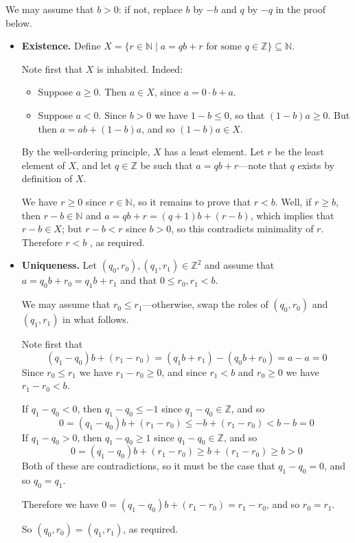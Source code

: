 \begin{cproof}
We may assume that $b>0$: if not, replace $b$ by $-b$ and $q$ by $-q$ in the proof below.

\begin{itemize}
\item \textbf{Existence.} Define $X = \{ r \in \mathbb{N} \mid a = qb+r \text{ for some } q \in \mathbb{Z} \} \subseteq \mathbb{N}$.

Note first that $X$ is inhabited. Indeed:
\begin{itemize}
\item Suppose $a \ge 0$. Then $a \in X$, since $a = 0 \cdot b + a$.
\item Suppose $a<0$. Since $b > 0$ we have $1-b \le 0$, so that $(1-b)a \ge 0$. But then $a = ab + (1-b)a$, and so $(1-b)a \in X$.
\end{itemize}

By the well-ordering principle, $X$ has a least element. Let $r$ be the least element of $X$, and let $q \in \mathbb{Z}$ be such that $a=qb+r$---note that $q$ exists by definition of $X$.

We have $r \ge 0$ since $r \in \mathbb{N}$, so it remains to prove that $r<b$. Well, %
if $r \ge b$, then $r-b \in \mathbb{N}$ and $a = qb+r = (q+1)b + (r-b)$, which implies that $r-b \in X$; but $r-b<r$ since $b>0$, so this contradicts minimality of $r$. Therefore $r<b$
, as required.

\item \textbf{Uniqueness.} Let $(q_0,r_0),(q_1,r_1) \in \mathbb{Z}^2$ and assume that $a=q_0b+r_0 = q_1b+r_1$ and that $0 \le r_0,r_1 < b$.

We may assume that $r_0 \le r_1$---otherwise, swap the roles of $(q_0,r_0)$ and $(q_1,r_1)$ in what follows.

Note first that
\[(q_1-q_0)b + (r_1-r_0) = (q_1b+r_1) - (q_0b+r_0) = a-a = 0 \]
Since $r_0 \le r_1$ we have $r_1-r_0 \ge 0$, and since $r_1<b$ and $r_0 \ge 0$ we have $r_1-r_0 < b$.

If $q_1-q_0<0$, then $q_1-q_0 \le -1$ since $q_1-q_0 \in \mathbb{Z}$, and so
\[ 0 = (q_1-q_0) b + (r_1-r_0) \le -b + (r_1-r_0) < b - b = 0 \]
If $q_1-q_0>0$, then $q_1-q_0 \ge 1$ since $q_1-q_0 \in \mathbb{Z}$, and so
\[ 0 = (q_1-q_0) b + (r_1-r_0) \ge b + (r_1-r_0) \ge b > 0 \]
Both of these are contradictions, so it must be the case that $q_1-q_0 = 0$, and so $q_0=q_1$.

Therefore we have $0 = (q_1-q_0)b+(r_1-r_0) = r_1-r_0$, and so $r_0=r_1$.

So $(q_0,r_0)=(q_1,r_1)$, as required.
\end{itemize}
\vspace{-20pt}
\end{cproof}

